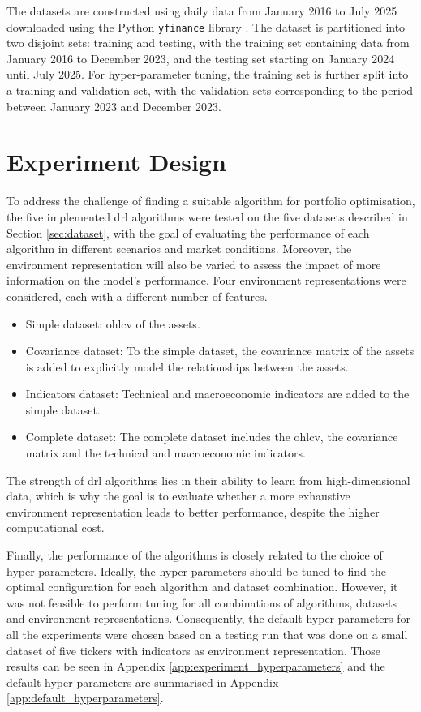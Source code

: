 The datasets are constructed using daily data from January 2016 to July 2025 downloaded using the Python \texttt{yfinance} library \cite{yfinance}. The dataset is partitioned into two disjoint sets: training and testing, with the training set containing data from January 2016 to December 2023, and the testing set starting on January 2024 until July 2025. For hyper-parameter tuning, the training set is further split into a training and validation set, with the validation sets corresponding to the period between January 2023 and December 2023. 

\section{Experiment Design} \label{sec:experiment-design}

To address the challenge of finding a suitable algorithm for portfolio optimisation, the five implemented \acrshort{drl} algorithms were tested on the five datasets described in Section \ref{sec:dataset}, with the goal of evaluating the performance of each algorithm in different scenarios and market conditions. Moreover, the environment representation will also be varied to assess the impact of more information on the model's performance. Four environment representations were considered, each with a different number of features.
\begin{itemize}
    \item Simple dataset: \acrfull{ohlcv} of the assets.
    \item Covariance dataset: To the simple dataset, the covariance matrix of the assets is added to explicitly model the relationships between the assets.
    \item Indicators dataset: Technical and macroeconomic indicators are added to the simple dataset.
    \item Complete dataset: The complete dataset includes the \acrshort{ohlcv}, the covariance matrix and the technical and macroeconomic indicators.
\end{itemize}

The strength of \acrshort{drl} algorithms lies in their ability to learn from high-dimensional data, which is why the goal is to evaluate whether a more exhaustive environment representation leads to better performance, despite the higher computational cost.

Finally, the performance of the algorithms is closely related to the choice of hyper-parameters. Ideally, the hyper-parameters should be tuned to find the optimal configuration for each algorithm and dataset combination. However, it was not feasible to perform tuning for all combinations of algorithms, datasets and environment representations. Consequently, the default hyper-parameters for all the experiments were chosen based on a testing run that was done on a small dataset of five tickers with indicators as environment representation. Those results can be seen in Appendix \ref{app:experiment_hyperparameters} and the default hyper-parameters are summarised in Appendix \ref{app:default_hyperparameters}.

